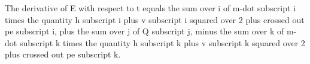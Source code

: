 The derivative of E with respect to t equals the sum over i of m-dot subscript i times the quantity h subscript i plus v subscript i squared over 2 plus crossed out pe subscript i, plus the sum over j of Q subscript j, minus the sum over k of m-dot subscript k times the quantity h subscript k plus v subscript k squared over 2 plus crossed out pe subscript k.